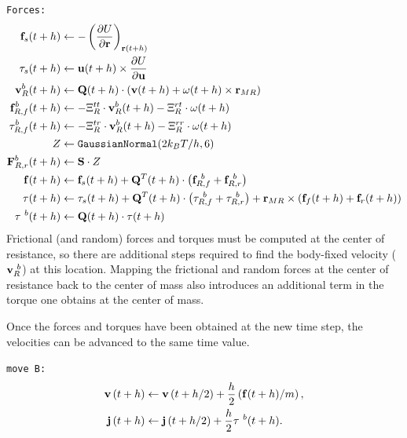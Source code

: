 \documentclass[letterpaper]{report}
\begin{document}
{\tt Forces:}
\begin{align*}
{\bf f}_{s}(t + h) & \leftarrow
    - \left(\frac{\partial U}{\partial {\bf r}}\right)_{{\bf r}(t + h)} \\
%
{\bf \tau}_{s}(t + h) &\leftarrow {\bf u}(t + h)
    \times \frac{\partial U}{\partial {\bf u}} \\
%
{\bf v}^{b}_{R}(t+h) & \leftarrow \mathbf{Q}(t+h) \cdot \left({\bf v}(t+h) + {\bf \omega}(t+h) \times {\bf r}_{MR} \right) \\
%
{\bf f}_{R,f}^{b}(t+h) & \leftarrow - \Xi_{R}^{tt} \cdot
{\bf v}^{b}_{R}(t+h) - \Xi_{R}^{rt} \cdot {\bf \omega}(t+h) \\
%
{\bf \tau}_{R,f}^{b}(t+h) & \leftarrow - \Xi_{R}^{tr} \cdot
{\bf v}^{b}_{R}(t+h) - \Xi_{R}^{rr} \cdot {\bf \omega}(t+h) \\
%
Z & \leftarrow  {\tt GaussianNormal}(2 k_B T / h, 6) \\
{\bf F}_{R,r}^{b}(t+h) & \leftarrow {\bf S} \cdot Z \\
%
{\bf f}(t+h) & \leftarrow {\bf f}_{s}(t+h) + \mathbf{Q}^{T}(t+h)
\cdot \left({\bf f}_{R,f}^{~b} + {\bf f}_{R,r}^{~b} \right) \\
%
\tau(t+h) & \leftarrow \tau_{s}(t+h) + \mathbf{Q}^{T}(t+h) \cdot \left(\tau_{R,f}^{~b} + \tau_{R,r}^{~b} \right) + {\bf r}_{MR} \times \left({\bf f}_{f}(t+h) + {\bf f}_{r}(t+h) \right) \\
\tau^{~b}(t+h) & \leftarrow \mathbf{Q}(t+h) \cdot \tau(t+h) \\
\end{align*}
Frictional (and random) forces and torques must be computed at the
center of resistance, so there are additional steps required to find
the body-fixed velocity (${\bf v}_{R}^{~b}$) at this location.  Mapping
the frictional and random forces at the center of resistance back to
the center of mass also introduces an additional term in the torque
one obtains at the center of mass.

Once the forces and torques have been obtained at the new time step,
the velocities can be advanced to the same time value.

{\tt move B:}
\begin{align*}
{\bf v}\left(t + h \right)  &\leftarrow  {\bf v}\left(t + h / 2
\right)
    + \frac{h}{2} \left( {\bf f}(t + h) / m \right), \\
%
{\bf j}\left(t + h \right)  &\leftarrow {\bf j}\left(t + h / 2
\right)
    + \frac{h}{2} {\bf \tau}^{~b}(t + h) .
\end{align*}
\end{document}
